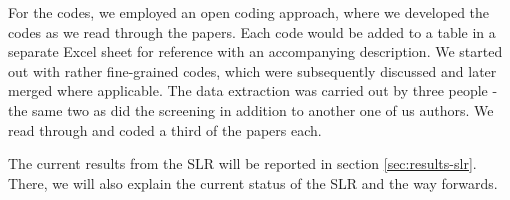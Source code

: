 For the codes, we employed an open coding approach, where we developed the codes as we read through the papers. Each code would be added to a table in a separate Excel sheet for reference with an accompanying description. We started out with rather fine-grained codes, which were subsequently discussed and later merged where applicable. The data extraction was carried out by three people - the same two as did the screening in addition to another one of us authors. We read through and coded a third of the papers each.

The current results from the SLR will be reported in section \ref{sec:results-slr}. There, we will also explain the current status of the SLR and the way forwards.